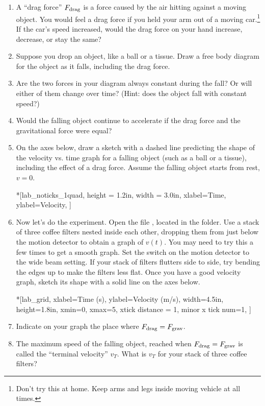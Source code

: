 \begin{enumerate}[labparts]
\item A ``drag force'' $F_{\rm drag}$ is a force caused by the air hitting against a moving object.  You would feel a drag force if you held your arm out of a moving car.\footnote{Don't try this at home.  Keep arms and legs inside moving vehicle at all times.}  If the car's speed increased, would the drag force on your hand increase, decrease, or stay the same?
\answerspace{0.3in}

\item Suppose you drop an object, like a ball or a tissue.  Draw a free body diagram for the object as it falls, including the drag force.
\answerspace{1.2in}

\item Are the two forces in your diagram always constant during the fall?  Or will either of them change over time?  (Hint: does the object fall with constant speed?)
\answerspace{0.5in}

\item Would the falling object continue to accelerate if the drag force and the gravitational force were equal?
\answerspace{0.5in}

\item On the axes below, draw a sketch with a dashed line predicting the shape of the velocity vs. time graph for a falling object (such as a ball or a tissue), including the effect of a drag force.  Assume the falling object starts from rest, $v=0$.

\begin{lab_axis}*[lab_noticks_1quad,
	height = {1.2in}, width = {3.0in},
	xlabel={Time},
	ylabel={Velocity},
	]
\end{lab_axis}

\item Now let's do the experiment.  Open the file , located in the \filename{\coursefolder} folder. Use a stack of three coffee filters nested inside each other, dropping them from just below the motion detector to obtain a graph of $v(t)$.  You may need to try this a few times to get a smooth graph.  Set the switch on the motion detector to the wide beam setting.  If your stack of filters flutters side to side, try bending the edges up to make the filters less flat.  Once you have a good velocity graph, sketch its shape with a solid line on the axes below.  

\begin{lab_axis}*[lab_grid,
	xlabel={Time (s)},
	ylabel={Velocity (m/s)},
	width=4.5in, height=1.8in,
	xmin=0, xmax=5,
	xtick distance = 1,
	minor x tick num=1,
	]
\end{lab_axis}

\item Indicate on your graph the place where $F_{\rm drag} = F_{\rm grav}$.  

\item The maximum speed of the falling object, reached when $F_{\rm drag} = F_{\rm grav}$ is called the ``terminal velocity'' $v_T$.  What is $v_T$ for your stack of three coffee filters?
\answerspace{0.5in}

\end{enumerate}

